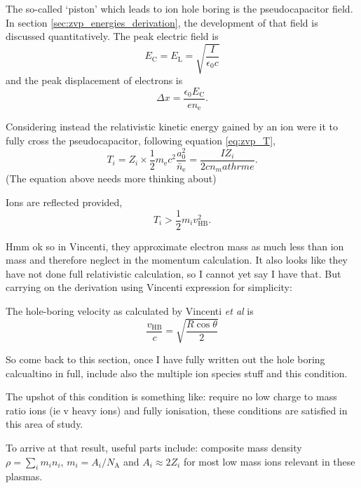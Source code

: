 The so-called `piston' which leads to ion hole boring is the pseudocapacitor field. In section \ref{sec:zvp_energies_derivation}, the development of that field is discussed quantitatively. The peak electric field is
\begin{equation}
	E_\mathrm{C} = E_\mathrm{L} = \sqrt{\frac{I}{\epsilon_0 c}}
\end{equation}
and the peak displacement of electrons is 
\begin{equation}
	\Delta x = \frac{\epsilon_0 E_\mathrm{C}}{en_\mathrm{e}}.
\end{equation}

Considering instead the relativistic kinetic energy gained by an ion were it to fully cross the pseudocapacitor, following equation \ref{eq:zvp_T},
\begin{equation}
	T_i = Z_i \times \frac{1}{2}m_\mathrm{e}c^2 \frac{a^2_0}{\bar{n}_\mathrm{e}} = \frac{IZ_i}{2cn_mathrm{e}}.
\end{equation}
(The equation above needs more thinking about)

Ions are reflected provided,
\begin{equation}
	T_i > \frac{1}{2}m_iv^2_\mathrm{HB}.
\end{equation}

Hmm ok so in Vincenti, they approximate electron mass as much less than ion mass and therefore neglect in the momentum calculation. It also looks like they have not done full relativistic calculation, so I cannot yet say I have that. But carrying on the derivation using Vincenti expression for simplicity:

The hole-boring velocity as calculated by Vincenti \textit{et al} \cite{vincentiOpticalPropertiesRelativistic2014} is
\begin{equation}
	\frac{v_\mathrm{HB} }{c}= \sqrt{\frac{R\cos\theta}{2}}
\end{equation}

So come back to this section, once I have fully written out the hole boring calcualtino in full, include also the multiple ion species stuff and this condition.

The upshot of this condition is something like: require no low charge to mass ratio ions (ie v heavy ions) and fully ionisation, these conditions are satisfied in this area of study.

To arrive at that result, useful parts include:
composite mass density $\rho = \sum_i m_i n_i$, $m_i = A_i/N_\mathrm{A}$ and $A_i \approx 2Z_i$ for most low mass ions relevant in these plasmas.



